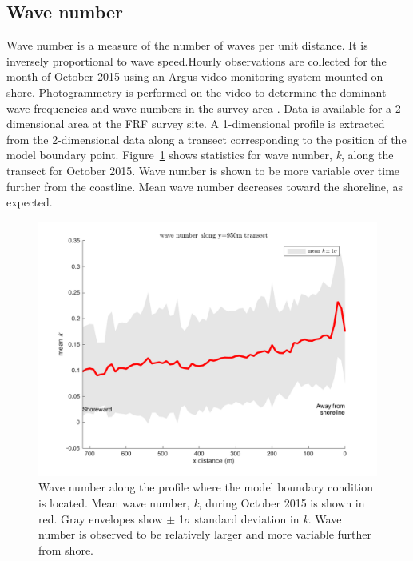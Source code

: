\subsection{Wave number}

Wave number is a measure of the number of waves per unit distance. It is inversely proportional to wave speed.Hourly observations are collected for the month of October 2015 using an Argus video monitoring system mounted on shore. Photogrammetry is performed on the video to determine the dominant wave frequencies and wave numbers in the survey area \citep{holman2013}. Data is available for a 2-dimensional area at the FRF survey site. A 1-dimensional profile is extracted from the 2-dimensional data along a transect corresponding to the position of the model boundary point. Figure~\ref{k1Dmean} shows statistics for wave number, \textit{k}, along the transect for October 2015. Wave number is shown to be more variable over time further from the coastline. Mean wave number decreases toward the shoreline, as expected.



\begin{figure}[h]
\centering
\includegraphics[width=.55\linewidth]{img/k1Dmean_std.png}
\caption{Wave number along the profile where the model boundary condition is located. Mean wave number, \textit{k}, during October 2015 is shown in red. Gray envelopes show $\pm$ 1$\sigma$ standard deviation in \textit{k}. Wave number is observed to be relatively larger and more variable further from shore.}
\label{k1Dmean}
\end{figure}
